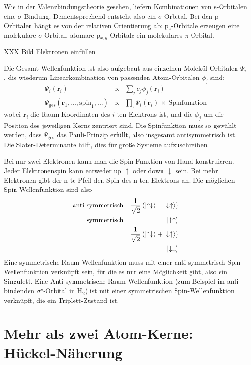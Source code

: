 Wie in der Valenzbindungstheorie gesehen, liefern Kombinationen von s-Orbitalen eine $\sigma$-Bindung. Dementsprechend entsteht also ein $\sigma$-Orbital. Bei den p-Orbitalen hängt es von der relativen Orientierung ab: p$_z$-Orbitale erzeugen eine molekulare $\sigma$-Orbital, atomare p$_{x,y}$-Orbitale ein molekulares  $\pi$-Orbital. 

XXX Bild Elektronen einfüllen

Die Gesamt-Wellenfunktion ist also aufgebaut aus einzelnen Molekül-Orbitalen $\Psi_i$, die wiederum Linearkombination von passenden Atom-Orbitalen $\phi_j$ sind:
\begin{eqnarray}
 \Psi_i(\mathbf{r}_i) & \propto &  \sum_j c_j \phi_j(\mathbf{r}_i) \\
  \Psi_\text{ges}(\mathbf{r}_1, ..., \text{spin}_1, ...)  & \propto & \prod_i \Psi_i(\mathbf{r}_i) \, \times \, \text{Spinfunktion}
\end{eqnarray}
wobei $\mathbf{r}_i$ die Raum-Koordinaten des $i$-ten Elektrons ist, und die $\phi_j$ um die Position des jeweiligen Kerns zentriert sind. Die Spinfunktion muss so gewählt werden, dass $ \Psi_\text{ges}$ das Pauli-Prinzip erfüllt, also insgesamt antisymmetrisch ist. Die Slater-Determinante hilft, dies für große Systeme aufzuschreiben.

Bei nur zwei Elektronen kann man die Spin-Funktion von Hand konstruieren. Jeder Elektronenspin kann entweder up $\uparrow$ oder down $\downarrow$ sein. Bei mehr Elektronen gibt der n-te Pfeil den Spin des n-ten Elektrons an.  Die möglichen Spin-Wellenfunktion sind also 
\begin{eqnarray}
\text{anti-symmetrisch} &  & \frac{1}{\sqrt{2}} \left( \ket{\uparrow \downarrow} - \ket{\downarrow \uparrow} \right) \\
\text{symmetrisch} &  &\ket{\uparrow \uparrow}  \\
& &\frac{1}{\sqrt{2}} \left( \ket{\uparrow \downarrow} + \ket{\downarrow \uparrow} \right) \\
& &\ket{\downarrow \downarrow}  
\end{eqnarray}
Eine symmetrische Raum-Wellenfunktion muss mit einer anti-symmetrisch Spin-Wellenfunktion verknüpft sein, für die es nur eine Möglichkeit gibt, also ein Singulett. Eine Anti-symmetrische Raum-Wellenfunktion (zum Beispiel im anti-bindenden $\sigma^\star$-Orbital in H$_2$) ist mit einer symmetrischen Spin-Wellenfunktion verknüpft, die ein Triplett-Zustand ist.

\section{Mehr als zwei Atom-Kerne: Hückel-Näherung}

